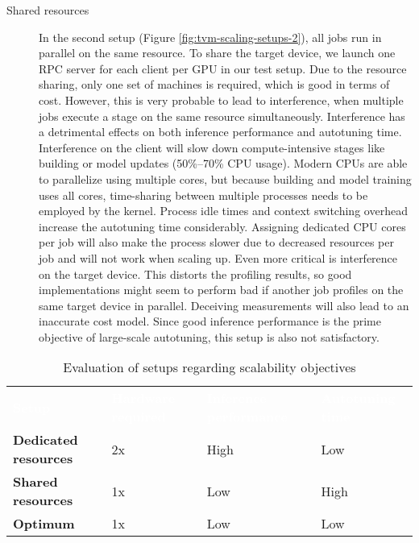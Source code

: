 \begin{description}
	\item[Shared resources] In the second setup (Figure \ref{fig:tvm-scaling-setups-2}), all jobs run in parallel on the same resource. To share the target device, we launch one RPC server for each client per GPU in our test setup. Due to the resource sharing, only one set of machines is required, which is good in terms of cost. However, this is very probable to lead to interference, when multiple jobs execute a stage on the same resource simultaneously. Interference has a detrimental effects on both inference performance and autotuning time. Interference on the client will slow down compute-intensive stages like building or model updates (50\%--70\% CPU usage). Modern CPUs are able to parallelize using multiple cores, but because building and model training uses all cores, time-sharing between multiple processes needs to be employed by the kernel. Process idle times and context switching overhead increase the autotuning time considerably. Assigning dedicated CPU cores per job will also make the process slower due to decreased resources per job and will not work when scaling up. Even more critical is interference on the target device. This distorts the profiling results, so good implementations might seem to perform bad if another job profiles on the same target device in parallel. Deceiving measurements will also lead to an inaccurate cost model. Since good inference performance is the prime objective of large-scale autotuning, this setup is also not satisfactory.
\end{description}

\begin{table}
	\newcommand\good[1]{\textcolor{hpe-green}{#1}}
	\newcommand\bad[1]{\textcolor{hpe-orange}{#1}}
	\newcommand\heading[1]{\textcolor{white}{\textbf{#1}}}
	\renewcommand{\arraystretch}{1.2}
	\sffamily
	\centering
	\begin{tabular}{l l l l}
	\rowcolor{black} \heading{Setup} & \heading{Hardware required} & \heading{Inference performance} & \heading{Autotuning time} \vspace{2pt} \\
	\textbf{Dedicated resources} & \bad{2x} & \good{High} & \good{Low} \\
	\textbf{Shared resources} & \good{1x} & \bad{Low} & \bad{High} \\
	\textbf{Optimum} & \good{1x} & \good{Low} & \good{Low} \\
	\end{tabular}
	\caption{Evaluation of setups regarding scalability objectives}
	\label{tab:tvm-scaling-setups}
\end{table}

